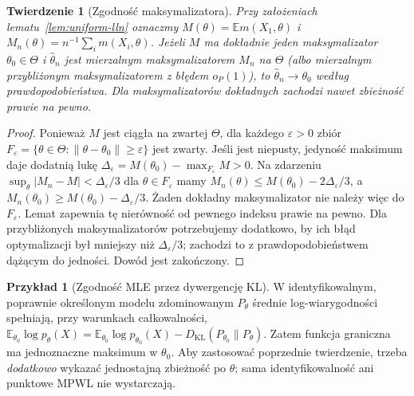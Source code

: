 \documentclass[11pt,a4paper,oneside]{report}
\numberwithin{equation}{chapter}
\theoremstyle{plain}
\newtheorem{twierdzenie}{Twierdzenie}[chapter]
\theoremstyle{definition}
\newtheorem{przyklad}{Przykład}[chapter]
\theoremstyle{remark}
\newcommand{\E}{\mathbb E}
\begin{document}
\begin{twierdzenie}[Zgodność maksymalizatora]\label{thm:m-est-consistency}
Przy założeniach lematu~\ref{lem:uniform-lln} oznaczmy
$M(\theta)=\E m(X_1,\theta)$ i
$M_n(\theta)=n^{-1}\sum_i m(X_i,\theta)$.
Jeżeli $M$ ma dokładnie jeden maksymalizator $\theta_0\in\Theta$
i $\widehat\theta_n$ jest mierzalnym maksymalizatorem $M_n$
na $\Theta$ (albo mierzalnym przybliżonym maksymalizatorem
z błędem $o_P(1)$), to $\widehat\theta_n\to\theta_0$
według prawdopodobieństwa. Dla maksymalizatorów dokładnych
zachodzi nawet zbieżność prawie na pewno.
\end{twierdzenie}
\begin{proof}
Ponieważ $M$ jest ciągła na zwartej $\Theta$, dla każdego
$\varepsilon>0$ zbiór
$F_\varepsilon=\{\theta\in\Theta:\|\theta-\theta_0\|
\ge\varepsilon\}$ jest zwarty. Jeśli jest niepusty,
jedyność maksimum daje dodatnią lukę
$\Delta_\varepsilon=M(\theta_0)-\max_{F_\varepsilon}M>0$.
Na zdarzeniu $\sup_\theta|M_n-M|<\Delta_\varepsilon/3$
dla $\theta\in F_\varepsilon$ mamy
$M_n(\theta)\le M(\theta_0)-2\Delta_\varepsilon/3$,
a $M_n(\theta_0)\ge M(\theta_0)-\Delta_\varepsilon/3$.
Żaden dokładny maksymalizator nie należy więc do
$F_\varepsilon$. Lemat zapewnia tę nierówność od pewnego
indeksu prawie na pewno. Dla przybliżonych maksymalizatorów
potrzebujemy dodatkowo, by ich błąd optymalizacji był mniejszy niż
$\Delta_\varepsilon/3$; zachodzi to z prawdopodobieństwem dążącym
do jedności. Dowód jest zakończony.
\end{proof}

\begin{przyklad}[Zgodność MLE przez dywergencję KL]
W identyfikowalnym, poprawnie określonym modelu zdominowanym
$P_\theta$ średnie log-wiarygodności spełniają, przy warunkach
całkowalności, $\E_{\theta_0}\log p_\theta(X)
=\E_{\theta_0}\log p_{\theta_0}(X)
-D_{\mathrm{KL}}(P_{\theta_0}\|P_\theta)$.
Zatem funkcja graniczna ma jednoznaczne maksimum w $\theta_0$.
Aby zastosować poprzednie twierdzenie, trzeba \emph{dodatkowo}
wykazać jednostajną zbieżność po $\theta$; sama identyfikowalność
ani punktowe MPWL nie wystarczają.
\end{przyklad}
\end{document}
